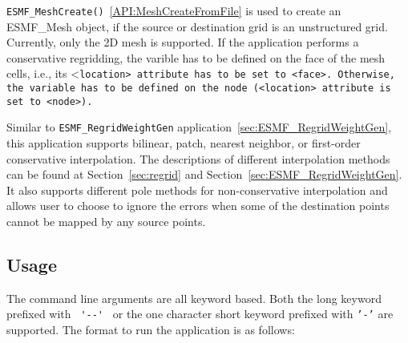{\tt ESMF\_MeshCreate()}~\ref{API:MeshCreateFromFile} is used to create an ESMF\_Mesh object, if the
source or destination grid is an unstructured grid. Currently, only the 2D mesh is supported.
If the application performs a conservative regridding, the varible has to be defined on the face of the mesh cells, i.e., its <\tt location> attribute has to be set to <\tt face>.  Otherwise, the variable has to be 
defined on the node (<\tt location> attribute is set to <\tt node>).

Similar to {\tt ESMF\_RegridWeightGen} application~\ref{sec:ESMF_RegridWeightGen}, this application supports
bilinear, patch, nearest neighbor, or first-order conservative interpolation. The descriptions of different 
interpolation methods can be found at Section~\ref{sec:regrid} and Section~\ref{sec:ESMF_RegridWeightGen}. 
It also supports different pole methods for non-conservative interpolation and allows user to choose to 
ignore the errors when some of the destination points cannot be mapped by any source points. 

\subsection{Usage}\label{sec:fileregridusage}

The command line arguments are all keyword based.  Both the long keyword prefixed with \verb+ '--' + or the
one character short keyword prefixed with {\tt '-'} are supported.  The format to run the application is
as follows:

